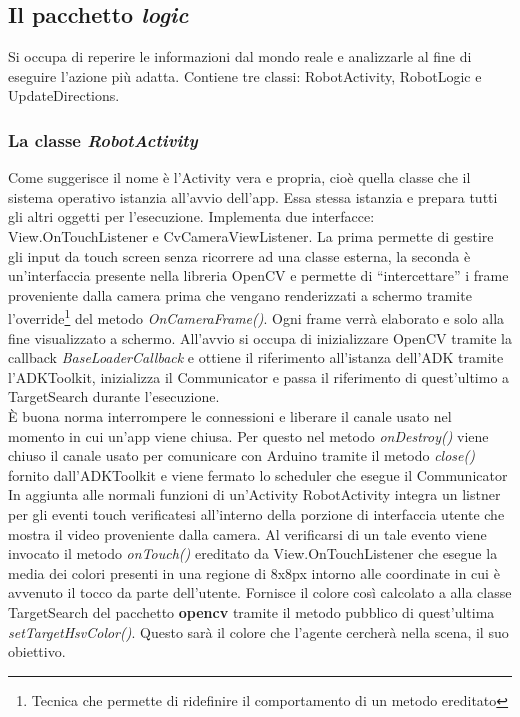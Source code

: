 \subsection {Il pacchetto \textit{logic}}
Si occupa di reperire le informazioni dal mondo reale e analizzarle al fine di
eseguire l'azione più adatta.
Contiene tre classi: RobotActivity, RobotLogic e UpdateDirections.
\subsubsection{La classe \emph{RobotActivity}}
Come suggerisce il nome è l'Activity vera e propria, cioè quella classe che il 
sistema operativo istanzia all'avvio dell'app. Essa stessa istanzia e prepara tutti gli 
altri oggetti per l'esecuzione. Implementa due interfacce: View.OnTouchListener 
e CvCameraViewListener. 
La prima permette di gestire gli input da touch screen senza ricorrere ad una classe esterna,
la seconda è un'interfaccia presente nella libreria OpenCV e permette di ``intercettare''
i frame proveniente dalla camera prima che vengano renderizzati a schermo tramite 
l'override\footnote{Tecnica che permette di ridefinire il comportamento di un metodo 
ereditato} del metodo \textit{OnCameraFrame()}. Ogni frame verrà elaborato e solo alla
fine visualizzato a schermo.
All'avvio si occupa di inizializzare OpenCV tramite la 
callback \textit{BaseLoaderCallback} e ottiene il riferimento all'istanza dell'ADK
tramite l'ADKToolkit, inizializza il Communicator e passa il riferimento di quest'ultimo
 a TargetSearch durante l'esecuzione.\\È buona norma interrompere le connessioni e liberare il canale usato 
nel momento in cui un'app viene chiusa. Per questo nel metodo \emph{onDestroy()} 
viene chiuso il canale usato per comunicare con Arduino tramite il metodo \emph{close()}
fornito dall'ADKToolkit e viene fermato lo scheduler che esegue il Communicator\\
In aggiunta alle normali funzioni di un'Activity RobotActivity integra un 
listner per gli eventi touch verificatesi all'interno della porzione di 
interfaccia utente che mostra il video proveniente dalla camera. Al verificarsi di un
tale evento viene invocato il metodo \emph{onTouch()} ereditato da View.OnTouchListener 
che esegue la media dei colori presenti in una regione di 8x8px intorno alle coordinate
in cui è avvenuto il tocco da parte dell'utente. Fornisce il colore così calcolato a 
alla classe TargetSearch del pacchetto \textbf{opencv} tramite il metodo pubblico 
di quest'ultima \emph{setTargetHsvColor()}. Questo sarà il colore che l'agente cercherà
nella scena, il suo obiettivo.

